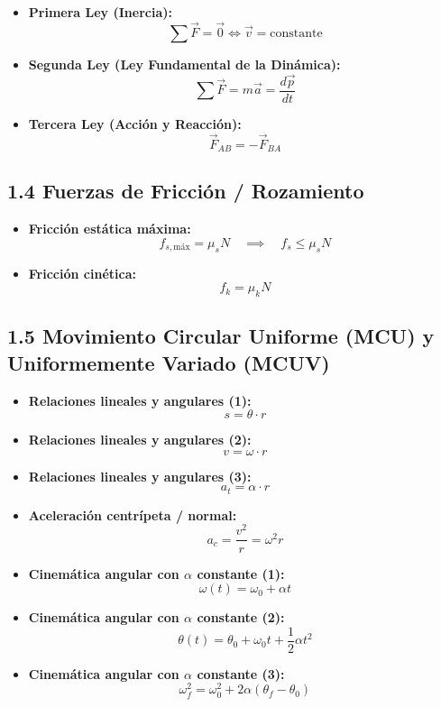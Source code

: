 \documentclass[11pt,a4paper]{article}
\begin{document}
\begin{itemize}
  \item \textbf{Primera Ley (Inercia):}
  \[
    \sum \vec{F} = \vec{0} \iff \vec{v} = \text{constante}
  \]
  \item \textbf{Segunda Ley (Ley Fundamental de la Dinámica):}
  \[
    \sum \vec{F} = m \vec{a} = \frac{d\vec{p}}{dt}
  \]
  \item \textbf{Tercera Ley (Acción y Reacción):}
  \[
    \vec{F}_{AB} = -\vec{F}_{BA}
  \]
\end{itemize}

\subsection*{1.4 Fuerzas de Fricción / Rozamiento}

\begin{itemize}
  \item \textbf{Fricción estática máxima:}
  \[
    f_{s,\mathrm{máx}} = \mu_s N \quad \implies \quad f_s \le \mu_s N
  \]
  \item \textbf{Fricción cinética:}
  \[
    f_k = \mu_k N
  \]
\end{itemize}

\subsection*{1.5 Movimiento Circular Uniforme (MCU) y Uniformemente Variado (MCUV)}

\begin{itemize}
  \item \textbf{Relaciones lineales y angulares (1):}
  \[
    s = \theta \cdot r
  \]
  \item \textbf{Relaciones lineales y angulares (2):}
  \[
    v = \omega \cdot r
  \]
  \item \textbf{Relaciones lineales y angulares (3):}
  \[
    a_t = \alpha \cdot r
  \]
  \item \textbf{Aceleración centrípeta / normal:}
  \[
    a_c = \frac{v^2}{r} = \omega^2 r
  \]
  \item \textbf{Cinemática angular con $\alpha$ constante (1):}
  \[
    \omega(t) = \omega_0 + \alpha t
  \]
  \item \textbf{Cinemática angular con $\alpha$ constante (2):}
  \[
    \theta(t) = \theta_0 + \omega_0 t + \frac{1}{2} \alpha t^2
  \]
  \item \textbf{Cinemática angular con $\alpha$ constante (3):}
  \[
    \omega_f^2 = \omega_0^2 + 2\alpha (\theta_f - \theta_0)
  \]
\end{itemize}
\end{document}
